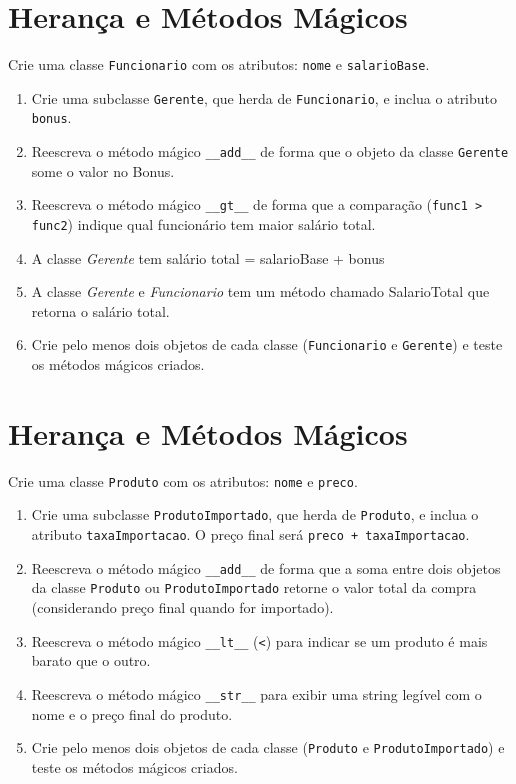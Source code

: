 \documentclass{article}
\begin{document}
\section{Herança e Métodos Mágicos}

Crie uma classe \texttt{Funcionario} com os atributos: \texttt{nome} e \texttt{salarioBase}.  

\begin{enumerate}
    \item Crie uma subclasse \texttt{Gerente}, que herda de \texttt{Funcionario}, e inclua o atributo  \texttt{bonus}.  
    \item Reescreva o método mágico \texttt{\_\_add\_\_} de forma que o objeto da classe \texttt{Gerente} some o valor no Bonus.  
    \item Reescreva o método mágico \texttt{\_\_gt\_\_} de forma que a comparação (\texttt{func1 > func2}) 
    indique qual funcionário tem maior salário total.
    \item A classe \textit{Gerente} tem salário total = salarioBase + bonus
    \item A classe \textit{Gerente} e \textit{Funcionario} tem um método chamado SalarioTotal que retorna o salário total. 
    \item Crie pelo menos dois objetos de cada classe (\texttt{Funcionario} e \texttt{Gerente}) e teste 
    os métodos mágicos criados.  
\end{enumerate}


\section{Herança e Métodos Mágicos}

Crie uma classe \texttt{Produto} com os atributos: \texttt{nome} e \texttt{preco}.  

\begin{enumerate}
    \item Crie uma subclasse \texttt{ProdutoImportado}, que herda de \texttt{Produto}, e inclua o atributo \texttt{taxaImportacao}. O preço final será \texttt{preco + taxaImportacao}.  
    \item Reescreva o método mágico \texttt{\_\_add\_\_} de forma que a soma entre dois objetos da classe \texttt{Produto} ou \texttt{ProdutoImportado} retorne o valor total da compra (considerando preço final quando for importado).  
    \item Reescreva o método mágico \texttt{\_\_lt\_\_} (\texttt{<}) para indicar se um produto é mais barato que o outro.  
    \item Reescreva o método mágico \texttt{\_\_str\_\_} para exibir uma string legível com o nome e o preço final do produto.  
    \item Crie pelo menos dois objetos de cada classe (\texttt{Produto} e \texttt{ProdutoImportado}) e teste os métodos mágicos criados.  
\end{enumerate}
\end{document}

